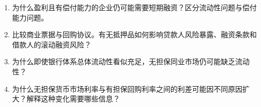 

\begin{enumerate}

\item 为什么盈利且有偿付能力的企业仍可能需要短期融资？区分流动性问题与偿付能力问题。

\item 比较商业票据与回购协议。有无抵押品如何影响贷款人风险暴露、融资条款和借款人的滚动融资风险？

\item 为什么即使银行体系总体流动性看似充足，无担保同业市场仍可能缺乏流动性？

\item 为什么无担保货币市场利率与有担保回购利率之间的利差可能因不同原因扩大？解释这种变化需要哪些信息？

\end{enumerate}



